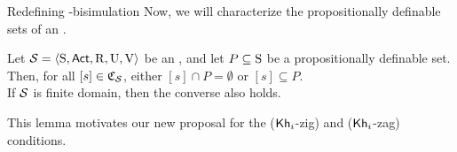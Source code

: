 \documentclass{beamer}
\begin{document}

\begin{frame}{Redefining \KHilogic-bisimulation}
    Now, we will characterize the propositionally definable sets of an \ults. \pause

    \vspace{5mm}


    \begin{lemma}
        \begin{small}
        Let $\mathcal{S}=\langle \operatorname{S},{\rm \sf Act},\operatorname{R},\operatorname{U},\operatorname{V} \rangle$ be an \ults, and let $P\subseteq \operatorname{S}$ be a propositionally definable set. Then, for all $[s]\in\mathfrak{C}_{\mathcal{S}}$, either $[s]\cap P =\emptyset$ or $[s]\subseteq P$. 
        \\If $\mathcal{S}$ is finite domain, then the converse also holds.
        \end{small}
    \end{lemma} \pause
    This lemma motivates our new proposal for the (${\operatorname{\sf Kh}_i}$-zig) and (${\operatorname{\sf Kh}_i}$-zag) conditions.
\end{frame}

\end{document}
